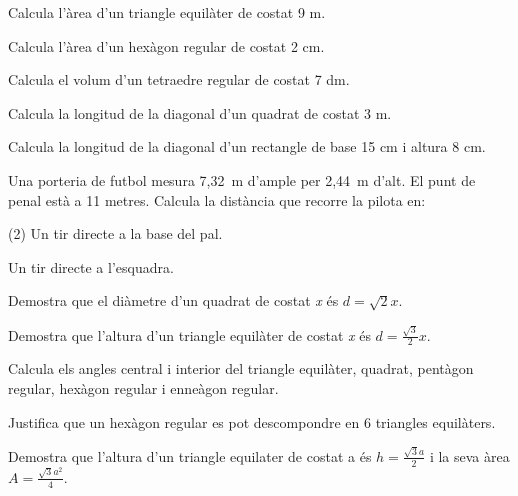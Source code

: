 \begin{mylist}

\exer  Calcula l'àrea d'un triangle equilàter de costat 9 m. 

\exer  Calcula l'àrea d'un hexàgon regular de costat 2 cm. 

\exer  \hot Calcula el volum d'un tetraedre regular de costat 7 dm.

\exer  Calcula la longitud de la diagonal d'un quadrat de costat 3 m.

\exer  Calcula la longitud de la diagonal d'un rectangle de base 15 cm i altura 8 cm.
\answers{17 cm}

\exer  Una porteria de futbol mesura 7,32~m d'ample per 2,44~m d'alt. El punt de penal està a 11 metres. Calcula la distància que recorre la pilota en:

\begin{tasks}(2)
	\task  Un tir directe a la base del pal.

 
	\task  Un tir directe a l'esquadra.
\end{tasks}
\answers{[11.593 m, 11.84 m]}


\exer  Demostra que el diàmetre d'un quadrat de costat \textit{x} és $d=\sqrt{2} x$.
 

\exer  Demostra que l'altura d'un triangle equilàter de costat \textit{x} és $d=\frac{\sqrt{3} }{2} x$. 
 

\exer  Calcula els angles central i interior del triangle equilàter, quadrat, pentàgon regular, hexàgon regular i enneàgon regular.

\exer  Justifica que un hexàgon regular es pot descompondre en 6 triangles equilàters.

\exer  Demostra que l'altura d'un triangle equilater de costat a és $h=\frac{\sqrt{3}a}{2}$ i la seva àrea $A=\frac{\sqrt{3}a^2}{4}$.


\end{mylist}
